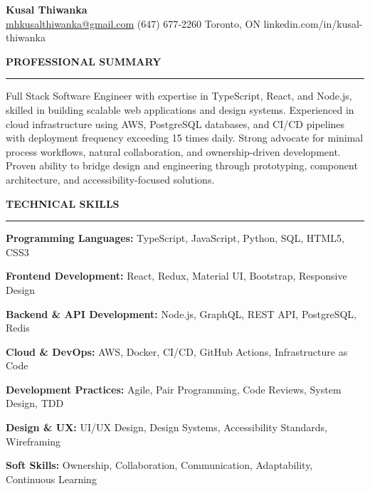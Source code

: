 \documentclass[10pt,letterpaper]{article}
\begin{document}
\begin{center}
{\LARGE\textbf{Kusal Thiwanka}}\\[3pt]
\href{mailto:mhkusalthiwanka@gmail.com}{mhkusalthiwanka@gmail.com}\hspace{2em}%
(647) 677{-}2260\hspace{2em}%
Toronto, ON\hspace{2em}
linkedin.com/in/kusal-thiwanka
\end{center}

\vspace{6pt}

\textbf{PROFESSIONAL SUMMARY}\\[-8pt]
\noindent\rule{\textwidth}{1pt}

\vspace{-2pt}

Full Stack Software Engineer with expertise in TypeScript, React, and Node.js, skilled in building scalable web applications and design systems. Experienced in cloud infrastructure using AWS, PostgreSQL databases, and CI/CD pipelines with deployment frequency exceeding 15 times daily. Strong advocate for minimal process workflows, natural collaboration, and ownership-driven development. Proven ability to bridge design and engineering through prototyping, component architecture, and accessibility-focused solutions.

\vspace{8pt}

\textbf{TECHNICAL SKILLS}\\[-8pt]
\noindent\rule{\textwidth}{1pt}

\vspace{-2pt}

\textbf{Programming Languages:} TypeScript, JavaScript, Python, SQL, HTML5, CSS3

\textbf{Frontend Development:} React, Redux, Material UI, Bootstrap, Responsive Design

\textbf{Backend \& API Development:} Node.js, GraphQL, REST API, PostgreSQL, Redis

\textbf{Cloud \& DevOps:} AWS, Docker, CI/CD, GitHub Actions, Infrastructure as Code

\textbf{Development Practices:} Agile, Pair Programming, Code Reviews, System Design, TDD

\textbf{Design \& UX:} UI/UX Design, Design Systems, Accessibility Standards, Wireframing

\textbf{Soft Skills:} Ownership, Collaboration, Communication, Adaptability, Continuous Learning
\end{document}
